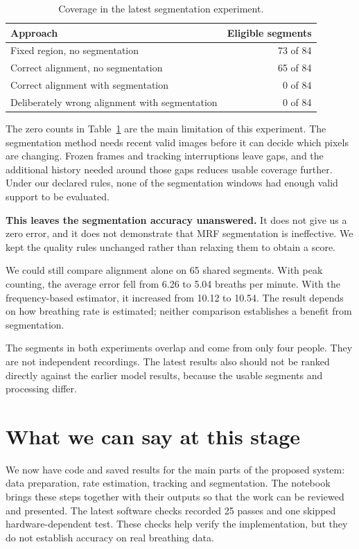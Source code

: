 \documentclass[11pt,a4paper]{article}
\begin{document}
\begin{table}[htbp]
\centering
\small
\begin{tabularx}{\linewidth}{@{}Xr@{}}
\toprule
Approach & Eligible segments\\
\midrule
Fixed region, no segmentation & 73 of 84\\
Correct alignment, no segmentation & 65 of 84\\
Correct alignment with segmentation & 0 of 84\\
Deliberately wrong alignment with segmentation & 0 of 84\\
\bottomrule
\end{tabularx}
\caption{Coverage in the latest segmentation experiment.}
\label{tab:coverage}
\end{table}

The zero counts in Table~\ref{tab:coverage} are the main limitation of this experiment. The segmentation method needs recent valid images before it can decide which pixels are changing. Frozen frames and tracking interruptions leave gaps, and the additional history needed around those gaps reduces usable coverage further. Under our declared rules, none of the segmentation windows had enough valid support to be evaluated.

\textbf{This leaves the segmentation accuracy unanswered.} It does not give us a zero error, and it does not demonstrate that MRF segmentation is ineffective. We kept the quality rules unchanged rather than relaxing them to obtain a score.

We could still compare alignment alone on 65 shared segments. With peak counting, the average error fell from 6.26 to 5.04 breaths per minute. With the frequency-based estimator, it increased from 10.12 to 10.54. The result depends on how breathing rate is estimated; neither comparison establishes a benefit from segmentation.

The segments in both experiments overlap and come from only four people. They are not independent recordings. The latest results also should not be ranked directly against the earlier model results, because the usable segments and processing differ.

\section{What we can say at this stage}
We now have code and saved results for the main parts of the proposed system: data preparation, rate estimation, tracking and segmentation. The notebook brings these steps together with their outputs so that the work can be reviewed and presented. The latest software checks recorded 25 passes and one skipped hardware-dependent test. These checks help verify the implementation, but they do not establish accuracy on real breathing data.
\end{document}
